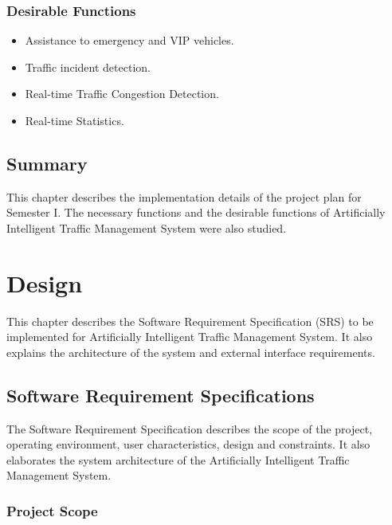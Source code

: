 \documentclass[openany,12pt]{report}
\begin{document}
	\subsection{Desirable  Functions}
	\begin{itemize}
		\item{Assistance to emergency and VIP vehicles.}	
		\item{Traffic incident detection.}
		\item{Real-time Traffic Congestion Detection.}
		\item{Real-time Statistics.}
		
	\end{itemize}
	
	\section{Summary}
	\hspace*{0.5in}This chapter describes the implementation details of the project plan for Semester I. The necessary functions and the desirable functions of Artificially Intelligent Traffic Management System were also studied.
	\chapter{Design}
	\hspace*{0.5in}This chapter describes the Software Requirement Specification (SRS) to be implemented for Artificially Intelligent Traffic Management System. It also explains the architecture of the system and external interface requirements.\\
	
	\section{Software Requirement Specifications}
	\hspace*{0.5in} The Software Requirement Specification describes the scope of the project, operating environment, user characteristics, design and constraints. It also elaborates the system architecture of the Artificially Intelligent Traffic Management System.
	
	\subsection{Project Scope}
	
\end{document}
